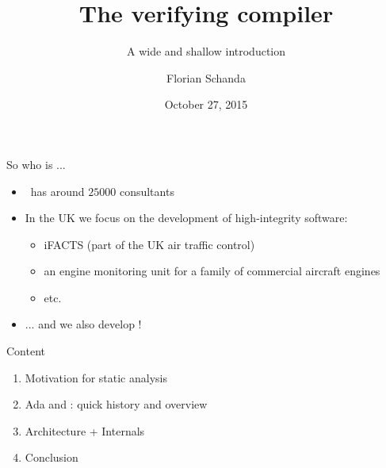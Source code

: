 \documentclass{beamer}
\author{Florian Schanda}
\title{The \spark 2014 verifying compiler}
\subtitle{A wide and shallow introduction}
\date{October 27, 2015}
\begin{document}
\begin{altrantitle}
\end{altrantitle}

\begin{frame}{So who is \company...}
  \begin{itemize}
  \item \company\ has around $25000$ consultants
  \item In the UK we focus on the development of high-integrity software:
    \begin{itemize}
    \item iFACTS (part of the UK air traffic control)
    \item an engine monitoring unit for a family of commercial aircraft
      engines
    \item etc.
    \end{itemize}
  \item ... and we also develop \spark!
  \end{itemize}
\end{frame}

\begin{frame}{Content}
  \begin{enumerate}
  \item Motivation for static analysis
  \item Ada and \spark: quick history and overview
  \item Architecture + Internals
  \item Conclusion
  \end{enumerate}
\end{frame}

\end{document}
